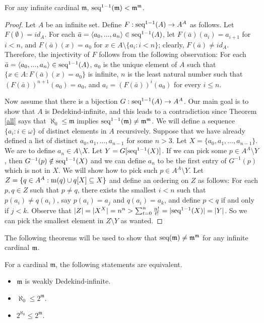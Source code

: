 \begin{theorem}\label{seq11mpowm}
For any infinite cardinal $\mathfrak{m}$, $\seq^{1-1}(\mathfrak{m}) < \mathfrak{m}^\mathfrak{m}$.
\end{theorem}

\begin{proof}
Let $A$ be an infinite set. Define $F:\seq^{1-1}(A)\to A^{A}$ as follows. Let $F(\emptyset) = id_{A}$. For each $\bar a = \langle a_0,...,a_n \rangle \in \seq^{1-1}(A)$, let $F(\bar a)(a_i) = a_{i+1}$ for $i<n$, and $F(\bar a)(x) = a_0$ for $x\in A\setminus\{a_{i}:i<n\}$; clearly, $F(\bar a) \neq id_{A}$. Therefore, the injectivity of $F$ follows from the following observation: For each $\bar a = \langle a_0,...,a_n \rangle \in \seq^{1-1}(A)$, $a_0$ is the unique element of $A$ such that $\{x\in A : F(\bar a)(x)=a_0\}$ is infinite, $n$ is the least natural number such that $(F(\bar a))^{n+1}(a_0)=a_0$, and $a_i = (F(\bar a))^{i}(a_0)$ for every $i\leq n$.

Now assume that there is a bijection $G:\seq^{1-1}(A)\to A^{A}$.
Our main goal is to show that $A$ is Dedekind-infinite, and this leads to a contradiction since Theorem \ref{all} says that $\aleph_{0}\leq\mathfrak{m}$ implies $\seq^{1-1}(\mathfrak{m})\neq \mathfrak{m}^{\mathfrak{m}}$. We will define a sequence $\{a_{i}:i\in\omega\}$ of distinct elements in $A$ recursively. Suppose that we have already defined a list of distinct $a_{0},a_{1},\dotsc,a_{n-1}$ for some $n>3$. Let $X=\{a_{0},a_{1},\dotsc,a_{n-1}\}$. We are to define $a_{n}\in A\setminus X$. Let $Y=G[\seq^{1-1}(X)]$. If we can pick some $p\in A^{A}\setminus Y$, then $G^{-1}(p)\notin \seq^{1-1}(X)$ and we can define $a_{n}$ to be the first entry of $G^{-1}(p)$ which is not in $X$. We will show how to pick such $p\in A^{A}\setminus Y$. Let $Z=\{q\in A^{A}:\m(q)\cup q[X]\subseteq X\}$ and define an ordering on $Z$ as follows: For each $p,q\in Z$ such that $p\neq q$, there exists the smallest $i<n$ such that $p(a_{i})\neq q(a_{i})$, say $p(a_{i})=a_{j}$ and $q(a_{i})=a_{k}$, and define $p<q$ if and only if $j<k$. Observe that $|Z|=|X^{X}|=n^{n}>\sum^{n}_{t=0}\frac{n!}{t!}=|\seq^{1-1}(X)|=|Y|$. So we can pick the smallest element in $Z\setminus Y$ as wanted. 
\end{proof}

The following theorems will be used to show that $\seq(\mathfrak{m})\neq \mathfrak{m}^\mathfrak{m}$ for any infinite cardinal $\frak{m}$.


\begin{theorem}\label{weaklydef}
For a cardinal $\mathfrak{m}$, the following statements are equivalent.\begin{itemize}\itemsep0em
    \item[1.] $\frak{m}$ is weakly Dedekind-infinite.
    \item[2.] $\aleph_{0}\leq 2^{\mathfrak{m}}$.
    \item[3.] $2^{\aleph_{0}}\leq 2^{\mathfrak{m}}$.
\end{itemize}
\end{theorem}

